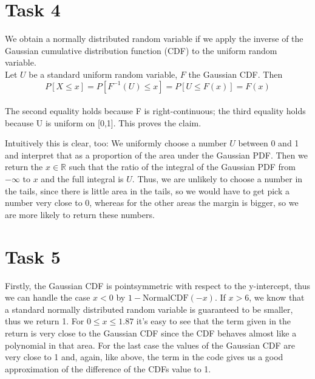 \documentclass[]{article}
\begin{document}
\section*{Task 4} We obtain a normally distributed random variable if we apply the
inverse of the Gaussian cumulative distribution function (CDF) to the uniform random variable.\\
Let $U$ be a standard uniform random variable, $F$ the Gaussian CDF. Then
\[P\left[X\le x\right]=P\left[F^{-1}(U) \le x\right]=P\left[U \le
F(x)\right]=F(x)\]\\
The second equality holds because F is right-continuous; the third
equality holds because U is uniform on [0,1]. This proves the claim.

Intuitively this is clear, too: We uniformly choose a number $U$ between 0 and 1 and
interpret that as a proportion of the area under the Gaussian PDF. Then we
return the $x\in\mathbb{R}$ such that the ratio of the integral of the Gaussian PDF from $-\infty$ to $x$ and the full integral is $U$. Thus,
we are unlikely to choose a number in the tails, since there is little area in
the tails, so we would have to get pick a number very close to 0, whereas for
the other areas the margin is bigger, so we are more likely to return these numbers.

\clearpage
\section*{Task 5} Firstly, the Gaussian CDF is pointsymmetric with respect to the
y-intercept, thus we can handle the case $x<0$ by $1-\mathrm{NormalCDF}(-x)$. If $x>6$,
we know that a standard normally distributed random variable is guaranteed to be smaller,
thus we return 1. For $0\le x\le 1.87$ it's easy to see
that the term given in the return is very close to the Gaussian CDF since
the CDF behaves almost like a polynomial in that area. For the last case the values
of the Gaussian CDF are very close to 1 and, again, like above, the term in the code gives us a
good approximation of the difference of the CDFs value to 1.
\end{document}
